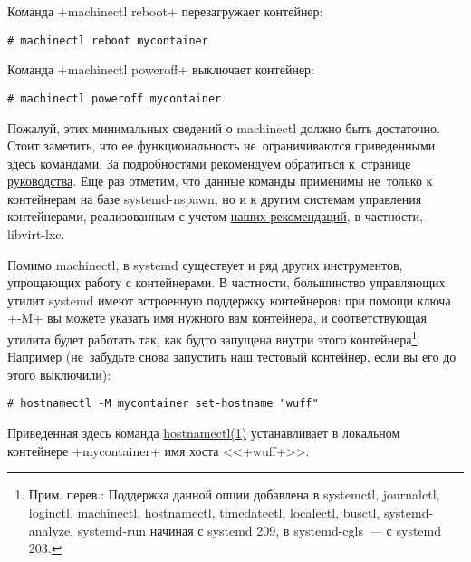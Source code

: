 \documentclass[10pt,oneside,a4paper]{article}
\begin{document}
Команда +machinectl reboot+ перезагружает контейнер:
\begin{Verbatim}
# machinectl reboot mycontainer
\end{Verbatim}

Команда +machinectl poweroff+ выключает контейнер:
\begin{Verbatim}
# machinectl poweroff mycontainer
\end{Verbatim}

Пожалуй, этих минимальных сведений о machinectl должно быть достаточно. Стоит
заметить, что ее функциональность не~ограничиваются приведенными здесь командами.
За подробностями рекомендуем обратиться 
к~\href{http://www.freedesktop.org/software/systemd/man/machinectl.html}{странице
руководства}. Еще раз отметим, что данные команды применимы не~только к
контейнерам на базе systemd-nspawn, но и к другим системам управления
контейнерами, реализованным с учетом
\href{http://www.freedesktop.org/wiki/Software/systemd/writing-vm-managers/}{наших
рекомендаций}, в частности, libvirt-lxc.

Помимо machinectl, в systemd существует и ряд других инструментов, упрощающих
работу с контейнерами. В частности, большинство управляющих утилит systemd имеют
встроенную поддержку контейнеров: при помощи ключа +-M+ вы можете указать имя
нужного вам контейнера, и соответствующая утилита будет работать так, как будто
запущена внутри этого контейнера\footnote{Прим. перев.: Поддержка данной опции
добавлена в systemctl, journalctl, loginctl, machinectl, hostnamectl,
timedatectl, localectl, busctl, systemd-analyze, systemd-run начиная с systemd
209, в systemd-cgls~--- с systemd 203.}.  Например (не~забудьте снова запустить
наш тестовый контейнер, если вы его до этого выключили):
\begin{Verbatim}
# hostnamectl -M mycontainer set-hostname "wuff"
\end{Verbatim}
Приведенная здесь команда
\href{http://www.freedesktop.org/software/systemd/man/hostnamectl.html}{hostnamectl(1)}
устанавливает в локальном контейнере +mycontainer+ имя хоста <<+wuff+>>.
\end{document}
